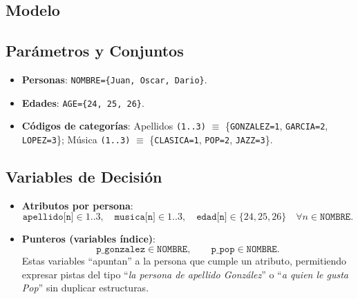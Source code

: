 
\subsection{Modelo}\label{sec:04-acertijo-logico-modelo}

\subsection*{Parámetros y Conjuntos}
\begin{itemize}
  \item \textbf{Personas}: \texttt{NOMBRE=\{Juan, Oscar, Dario\}}.
  \item \textbf{Edades}: \texttt{AGE=\{24, 25, 26\}}.
  \item \textbf{Códigos de categorías}: Apellidos \texttt{(1..3)} $\equiv$ \{\texttt{GONZALEZ=1}, \texttt{GARCIA=2}, \texttt{LOPEZ=3}\}; Música \texttt{(1..3)} $\equiv$ \{\texttt{CLASICA=1}, \texttt{POP=2}, \texttt{JAZZ=3}\}.
\end{itemize}

\subsection*{Variables de Decisión}
\begin{itemize}
  \item \textbf{Atributos por persona}:
  \[
  \texttt{apellido[n]}\in 1..3,\quad
  \texttt{musica[n]}\in 1..3,\quad
  \texttt{edad[n]}\in \{24,25,26\}\quad \forall n\in \texttt{NOMBRE}.
  \]
  \item \textbf{Punteros (variables índice)}:
  \[
  \texttt{p\_gonzalez}\in \texttt{NOMBRE},\qquad
  \texttt{p\_pop}\in \texttt{NOMBRE}.
  \]
  Estas variables “apuntan” a la persona que cumple un atributo, permitiendo expresar pistas del tipo “\emph{la persona de apellido González}” o “\emph{a quien le gusta Pop}” sin duplicar estructuras.
\end{itemize}

